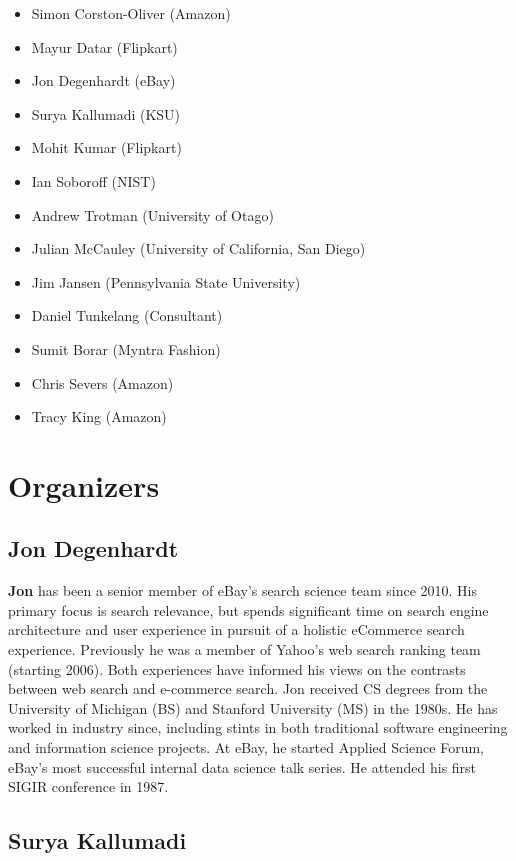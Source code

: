 \documentclass{acmart}
\begin{document}
\begin{itemize}
\item Simon Corston-Oliver (Amazon)
\item Mayur Datar (Flipkart)
\item Jon Degenhardt (eBay)
\item Surya Kallumadi (KSU)
\item Mohit Kumar (Flipkart)
\item Ian Soboroff (NIST)
\item Andrew Trotman (University of Otago)
\item Julian McCauley (University of California, San Diego)
\item Jim Jansen (Pennsylvania State University)
\item Daniel Tunkelang (Consultant)
\item Sumit Borar (Myntra Fashion)
\item Chris Severs (Amazon)
\item Tracy King (Amazon)
\end{itemize}

\section{Organizers}
\subsection*{Jon Degenhardt}

\textbf {Jon} has been a senior member of eBay's search science team since 2010.
His primary focus is search relevance, but spends significant time on search
engine architecture and user experience in pursuit of a holistic eCommerce
search experience. Previously he was a member of Yahoo's web search ranking team
(starting 2006). Both experiences have informed his views on the contrasts between
web search and e-commerce search. Jon received CS degrees from the University of
Michigan (BS) and Stanford University (MS) in the 1980s. He has worked in industry
since, including stints in both traditional software engineering and information science
projects. At eBay, he started Applied Science Forum, eBay's most successful
internal data science talk series. He attended his first SIGIR conference in 1987.

\subsection*{Surya Kallumadi}
\end{document}
